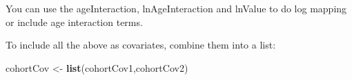 \documentclass[
]{article}
\newenvironment{Shaded}{\begin{snugshade}}{\end{snugshade}}
\newcommand{\KeywordTok}[1]{\textcolor[rgb]{0.13,0.29,0.53}{\textbf{#1}}}
\newcommand{\NormalTok}[1]{#1}
\newcommand{\StringTok}[1]{\textcolor[rgb]{0.31,0.60,0.02}{#1}}
\begin{document}
You can use the ageInteraction, lnAgeInteraction and lnValue to do log
mapping or include age interaction terms.

To include all the above as covariates, combine them into a list:

\begin{Shaded}
\begin{Highlighting}[]
\NormalTok{cohortCov <-}\StringTok{ }\KeywordTok{list}\NormalTok{(cohortCov1,cohortCov2)}
\end{Highlighting}
\end{Shaded}
\end{document}
